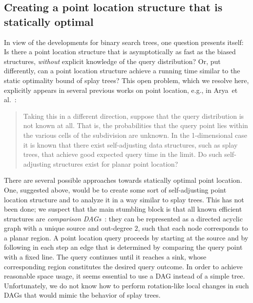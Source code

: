 \documentclass[11pt]{article}
\begin{document}
\subsection{Creating a point location structure that is statically optimal}

In view of the developments for binary search trees, one 
question presents itself:  Is there a point location structure that is
asymptotically as fast as the biased structures, \emph{without} explicit
knowledge of the query distribution? Or, put differently, can a point
location structure achieve a running time similar to the static optimality bound
of splay trees? This open problem, which we resolve here, explicitly appears in
several previous works on point location, e.g., in
Arya~et al.~\cite[Section 6]{AryaMaMoWo07}:

\begin{quote}
Taking this in a different direction, suppose that the query
distribution is not known at all. That is, the probabilities that the query
point lies within the various cells of the subdivision are unknown. In the
1-dimensional case it is known that there exist self-adjusting data structures,
such as splay trees, that achieve good expected query time in the limit.
Do such self-adjusting structures 
exist for planar point location?
\end{quote}

There are several possible approaches towards statically optimal
point location. One, suggested above, would be to create 
some sort of
self-adjusting point location structure and to analyze it in a way similar to
splay trees. This has not been done; we suspect that the main stumbling block is
that all known efficient structures are 
\emph{comparison DAGs}~\cite{kirk,ppl5,EdelsbrunnerGuSt86,Mulmuley90,trapseidel}: 
they can 
be represented as a directed acyclic graph with a unique source and 
out-degree $2$, such that each node corresponds to a planar region. A 
point location
query proceeds by starting at the source and by following in each step
an edge that is determined by comparing the query point with a fixed line.
The query continues until it reaches a sink, whose corresponding region
constitutes the desired query outcome. In order to achieve 
reasonable space
usage, it seems essential to use a DAG instead of  a simple tree.
Unfortunately, we do not know how to  perform 
rotation-like local changes in such DAGs that would mimic the behavior of
splay trees.
\end{document}
